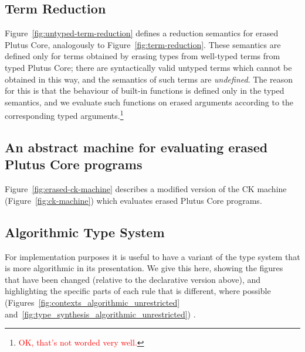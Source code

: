 \documentclass[a4paper]{article}
\newcommand{\red}[1]{\textcolor{red}{#1}}
\newcommand{\redfootnote}[1]{\red{\footnote{\red{#1}}}}
\begin{document}


\subsection{Term Reduction}
Figure~\ref{fig:untyped-term-reduction} defines a reduction semantics
for erased Plutus Core, analogously to
Figure~\ref{fig:term-reduction}.  These semantics are defined only for
terms obtained by erasing types from well-typed terms from typed
Plutus Core; there are syntactically valid untyped terms which cannot
be obtained in this way, and the semantics of such terms
are \textit{undefined}.  The reason for this is that the behaviour of
built-in functions is defined only in the typed semantics, and we
evaluate such functions on erased arguments according to the
corresponding typed arguments.\redfootnote{OK, that's not worded very well.}



\subsection{An abstract machine for evaluating erased Plutus Core programs}
Figure~\ref{fig:erased-ck-machine} describes a modified version of
the CK machine (Figure~\ref{fig:ck-machine}) which evaluates erased Plutus
Core programs.


\newpage
\begin{appendices}
\section{Algorithmic Type System}

For implementation purposes it is useful to have a variant of the type
system that is more algorithmic in its presentation. We give this
here, showing the figures that have been changed (relative to the
declarative version above), and highlighting the specific parts of
each rule that is different, where possible
(Figures~\ref{fig:contexts_algorithmic_unrestricted}
and~\ref{fig:type_synthesis_algorithmic_unrestricted}) .



\end{appendices}


\end{document}
